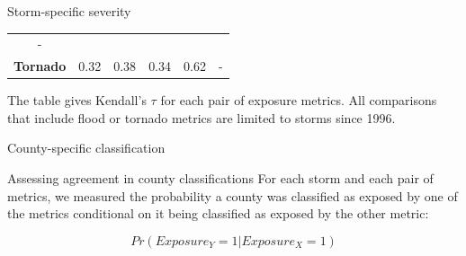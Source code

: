 \documentclass[ignorenonframetext,]{beamer}
\begin{document}
\begin{frame}{Storm-specific severity}
\begin{longtable}[]{@{}cccccc@{}}
\begin{minipage}[t]{0.10\columnwidth}
-\strut
\end{minipage}\tabularnewline
\begin{minipage}[t]{0.17\columnwidth}\centering\strut
\textbf{Tornado}\strut
\end{minipage} & \begin{minipage}[t]{0.13\columnwidth}\centering\strut
0.32\strut
\end{minipage} & \begin{minipage}[t]{0.08\columnwidth}\centering\strut
0.38\strut
\end{minipage} & \begin{minipage}[t]{0.08\columnwidth}\centering\strut
0.34\strut
\end{minipage} & \begin{minipage}[t]{0.09\columnwidth}\centering\strut
0.62\strut
\end{minipage} & \begin{minipage}[t]{0.10\columnwidth}\centering\strut
-\strut
\end{minipage}\tabularnewline
\bottomrule
\end{longtable}

\footnotesize The table gives Kendall's \(\tau\) for each pair of
exposure metrics. All comparisons that include flood or tornado metrics
are limited to storms since 1996.

\end{frame}

\begin{frame}{County-specific classification}

\begin{block}{Assessing agreement in county classifications}
For each storm and each pair of metrics, we measured the probability a county was classified as exposed by one of the metrics conditional on it being classified as exposed by the other metric:

\begin{equation}
Pr(Exposure_{Y} = 1 | Exposure_{X} = 1)
\end{equation}

\end{block}

\end{frame}
\end{document}
